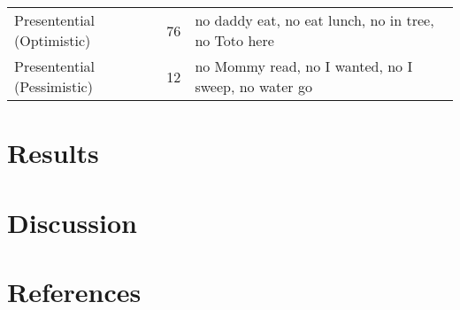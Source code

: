 \documentclass[man]{apa6}
\begin{document}
\begin{longtable}[]{@{}lll@{}}
\begin{minipage}[t]{0.27\columnwidth}\raggedright\strut
Presentential (Optimistic)\strut
\end{minipage} & \begin{minipage}[t]{0.16\columnwidth}\raggedright\strut
76\strut
\end{minipage} & \begin{minipage}[t]{0.39\columnwidth}\raggedright\strut
no daddy eat, no eat lunch, no in tree, no Toto here\strut
\end{minipage}\tabularnewline
\begin{minipage}[t]{0.27\columnwidth}\raggedright\strut
Presentential (Pessimistic)\strut
\end{minipage} & \begin{minipage}[t]{0.16\columnwidth}\raggedright\strut
12\strut
\end{minipage} & \begin{minipage}[t]{0.39\columnwidth}\raggedright\strut
no Mommy read, no I wanted, no I sweep, no water go\strut
\end{minipage}\tabularnewline
\bottomrule
\end{longtable}

\section{Results}\label{results-1}

\section{Discussion}\label{discussion}

\newpage

\section{References}\label{references}

\begingroup
\setlength{\parindent}{-0.5in} \setlength{\leftskip}{0.5in}

\hypertarget{refs}{}

\endgroup
\end{document}
